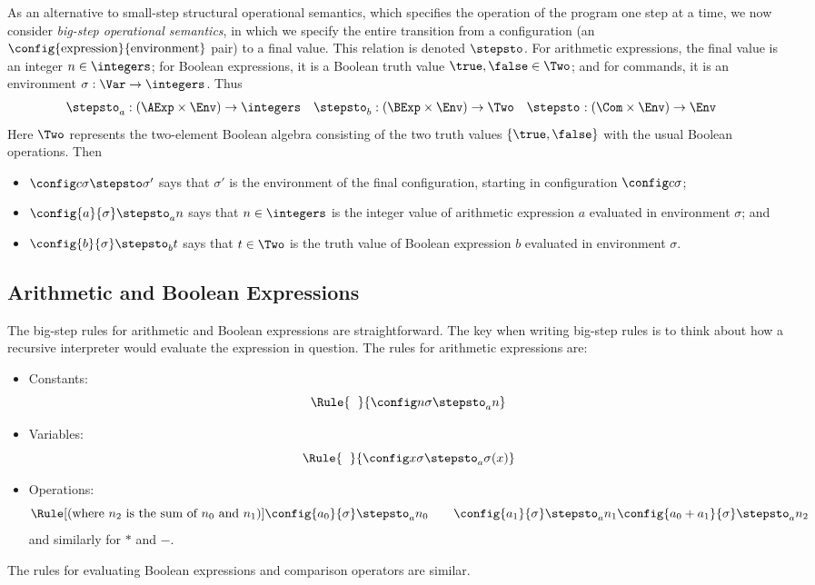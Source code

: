 As an alternative to small-step structural operational semantics, which specifies the operation of the program one step at a time, we now consider \emph{big-step operational semantics}, in which we specify the entire transition from a configuration (an $\config{\text{expression}}{\text{environment}}$ pair) to a final value. This relation is denoted $\stepsto$. For arithmetic expressions, the final value is an integer $n\in\integers$; for Boolean expressions, it is a Boolean truth value $\true,\false\in\Two$; and for commands, it is an environment $\sigma:\Var\to\integers$. Thus
\begin{align*}
\stepsto_a &: (\AExp\times\Env)\to\integers &
\stepsto_b &: (\BExp\times\Env)\to\Two &
\stepsto_{} &: (\Com\times\Env)\to\Env
\end{align*}
Here $\Two$ represents the two-element Boolean algebra consisting of the two truth values $\{\true,\false\}$ with the usual Boolean operations. Then
\begin{itemize}
\item
$\config c\sigma\stepsto\sigma'$ says that $\sigma'$ is the environment of the final configuration, starting in configuration $\config c\sigma$;
\item
$\config{a}{\sigma}\stepsto_a n$ says that $n\in\integers$ is the integer value of arithmetic expression $a$ evaluated in environment $\sigma$; and
\item
$\config{b}{\sigma}\stepsto_b t$ says that $t\in\Two$ is the truth value of Boolean expression $b$ evaluated in environment $\sigma$.
\end{itemize}

\subsection{Arithmetic and Boolean Expressions}

The big-step rules for arithmetic and Boolean expressions are
straightforward. The key when writing big-step rules is to think about
how a recursive interpreter would evaluate the expression in question.
The rules for arithmetic expressions are:
\begin{itemize}
\item
Constants:
\[
\Rule
{\phantom{f}}
{\config n\sigma\stepsto_a n}
\]
\item
Variables:
\[
\Rule
{\phantom{f}}
{\config x\sigma\stepsto_a \sigma(x)}
\]
\item
Operations:
\[
\Rule
[\text{(where $n_2$ is the sum of $n_0$ and $n_1$)}]
{\config{a_0}{\sigma}\stepsto_a n_0 \qquad \config{a_1}{\sigma}\stepsto_a n_1}
{\config{a_0+a_1}{\sigma}\stepsto_a n_2}
\]
and similarly for $*$ and $-$.
\end{itemize}
The rules for evaluating Boolean expressions and comparison operators are similar.

